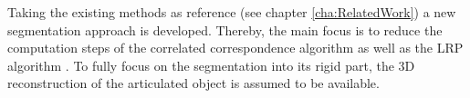 Taking the existing methods as reference (see chapter \ref{cha:RelatedWork}) a new segmentation approach is developed. Thereby, the main focus is to reduce the computation steps of the correlated correspondence algorithm \cite{CorrelatedCorrespondance} as well as the LRP algorithm \cite {guo2016correspondence}. To fully focus on the segmentation into its rigid part, the 3D reconstruction of the articulated object is assumed to be available.
